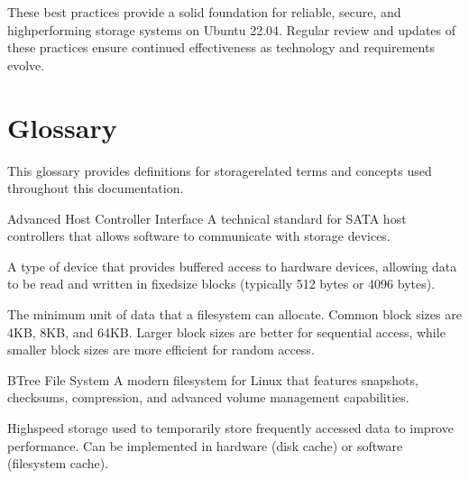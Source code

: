 \documentclass[letterpaper,10pt,english]{sphinxmanual}
\begin{document}
\sphinxAtStartPar
These best practices provide a solid foundation for reliable, secure, and high\sphinxhyphen{}performing storage systems on Ubuntu 22.04. Regular review and updates of these practices ensure continued effectiveness as technology and requirements evolve.

\sphinxstepscope


\chapter{Glossary}
\label{\detokenize{glossary:glossary}}\label{\detokenize{glossary::doc}}
\sphinxAtStartPar
This glossary provides definitions for storage\sphinxhyphen{}related terms and concepts used throughout this documentation.
\begin{description}
\sphinxAtStartPar
Advanced Host Controller Interface \sphinxhyphen{} A technical standard for SATA host controllers that allows software to communicate with storage devices.

\sphinxAtStartPar
A type of device that provides buffered access to hardware devices, allowing data to be read and written in fixed\sphinxhyphen{}size blocks (typically 512 bytes or 4096 bytes).

\sphinxAtStartPar
The minimum unit of data that a filesystem can allocate. Common block sizes are 4KB, 8KB, and 64KB. Larger block sizes are better for sequential access, while smaller block sizes are more efficient for random access.

\sphinxAtStartPar
B\sphinxhyphen{}Tree File System \sphinxhyphen{} A modern filesystem for Linux that features snapshots, checksums, compression, and advanced volume management capabilities.

\sphinxAtStartPar
High\sphinxhyphen{}speed storage used to temporarily store frequently accessed data to improve performance. Can be implemented in hardware (disk cache) or software (filesystem cache).


\end{description}
\end{document}
